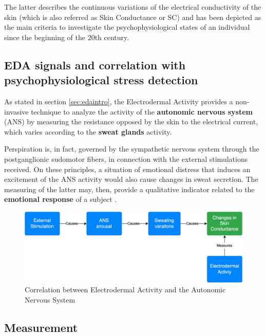 The latter describes the continuous variations of the electrical conductivity of the skin (which is also referred as Skin Conductance or SC) and has been depicted as the main criteria to investigate the psychophysiological states of an individual since the beginning of the 20th century.

\subsection{EDA signals and correlation with psychophysiological stress detection}\label{subsec:eda-signals}

As stated in section \ref{sec:edaintro}, the Electrodermal Activity provides a non-invasive technique to analyze the activity of the \textbf{autonomic nervous system} (ANS) by measuring the resistance opposed by the skin to the electrical current, which varies according to the \textbf{sweat glands} activity.

Perspiration is, in fact, governed by the sympathetic nervous system \cite{bartholomew} through the postganglionic sudomotor fibers, in connection with the external stimulations received. On these principles, a situation of emotional distress that induces an excitement of the ANS activity would also cause changes in sweat secretion. The measuring of the latter may, then, provide a qualitative indicator related to the \textbf{emotional response} of a subject \cite{carlson}.

\begin{figure}[h]
    \centering
    \includegraphics[width=\textwidth]{./images/eda-cause-effect.drawio.png}
    \caption{Correlation between Electrodermal Activity and the Autonomic Nervous System}
    \label{fig:eda-ans}
\end{figure}

\subsection{Measurement}\label{subsec:eda-measurement}


